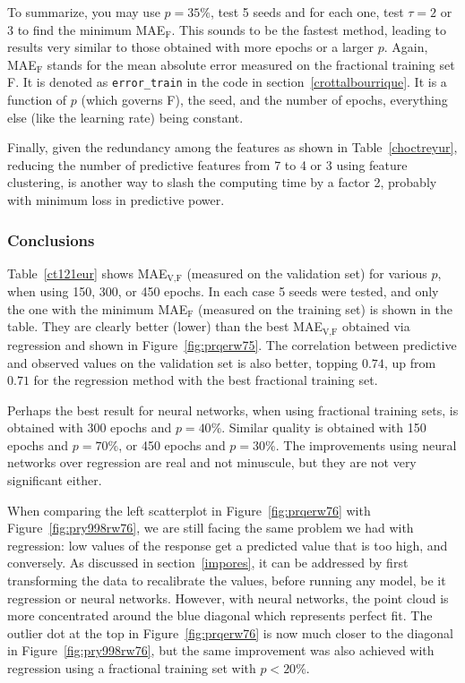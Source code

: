 \documentclass[oneside,10pt]{book}
\begin{document}
To summarize, you may use $p=35\%$, test 5 seeds and for each one,
 test $\tau = 2$ or $3$ to find the minimum MAE$_\text{F}$. This sounds to be the fastest method,
 leading to results very similar to those obtained with more epochs or a larger $p$.
Again, MAE$_\text{F}$ stands for the mean absolute error measured on the fractional training set F. It is denoted as \texttt{error\_train} in the code
 in section~\ref{crottalbourrique}. It is a function of $p$ (which governs F), the seed, and the number of epochs, everything else (like the learning rate) being constant.

Finally, given the redundancy among the features as shown in Table~\ref{choctreyur}, reducing the number of predictive features
 from 7 to 4 or 3 using \textcolor{index}{feature clustering}, is another way to slash the computing time by a factor 2, probably with minimum loss in predictive
 power.

\subsubsection{Conclusions}

Table~\ref{ct121eur} shows MAE$_{\text{V,F}}$ (measured on the validation set) for various $p$, when using 150, 300, or 450 epochs. In each case 5 seeds were tested, and only the one with the minimum MAE$_\text{F}$ (measured on the training set) is shown in the table. They are clearly better (lower) than the best MAE$_{\text{V,F}}$ obtained via regression and shown in Figure~\ref{fig:prqerw75}. The correlation between predictive and observed values on the validation set is also better, topping $0.74$, up from $0.71$ for the regression method with the best fractional training set.






Perhaps the best result for neural networks, when using fractional training sets, is obtained with 300 epochs and $p=40\%$. Similar quality is obtained with 150 epochs and $p=70\%$, or 450 epochs and $p=30\%$. The improvements using neural networks over regression are real and not minuscule, but they are not
 very significant either.

When comparing the left scatterplot in Figure~\ref{fig:prqerw76} with Figure~\ref{fig:pry998rw76}, we are still facing the same problem we had with regression:
  low values of the response get a predicted value that is too high, and conversely.  As discussed in section~\ref{impores}, it can be addressed by first transforming
 the data to recalibrate the values, before running any model, be it regression or neural networks. However, with neural networks, the point cloud is more concentrated around the blue diagonal which represents perfect fit. The outlier dot at the top in Figure~\ref{fig:prqerw76} is now much closer
to the diagonal in Figure~\ref{fig:pry998rw76}, but the same improvement was also achieved with regression using a fractional training set with $p<20\%$.
\end{document}
